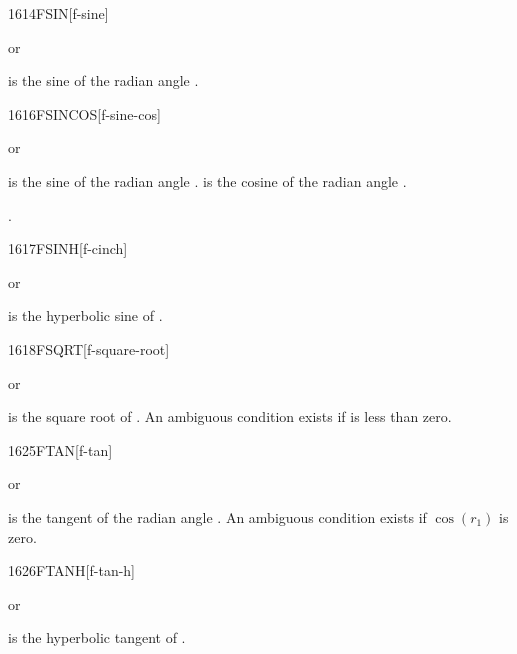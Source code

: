 \begin{worddef}{1614}{FSIN}[f-sine]
\item {} or

	 is the sine of the radian angle .
\end{worddef}


\begin{worddef}{1616}{FSINCOS}[f-sine-cos]
\item {} or

	 is the sine of the radian angle . 
	is the cosine of the radian angle .

\see {}.
\end{worddef}


\begin{worddef}{1617}{FSINH}[f-cinch]
\item {} or

	 is the hyperbolic sine of .
\end{worddef}


\begin{worddef}{1618}{FSQRT}[f-square-root]
\item {} or

	 is the square root of . An ambiguous
	condition exists if  is less than zero.
\end{worddef}


\begin{worddef}{1625}{FTAN}[f-tan]
\item {} or

	 is the tangent of the radian angle . An
	ambiguous condition exists if $\cos(r_1)$ is zero.
\end{worddef}


\begin{worddef}{1626}{FTANH}[f-tan-h]
\item {} or

	 is the hyperbolic tangent of .
\end{worddef}


